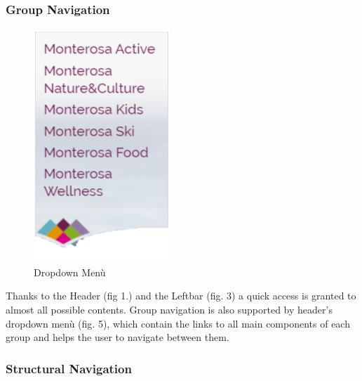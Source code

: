 \subsubsection{Group Navigation}
\begin{figure}
    	\includegraphics[width=0.9\linewidth]{./assets/dropdown-menu.png}
	\caption{Dropdown Menù}
\end{figure} Thanks to the Header (fig 1.) and the Leftbar (fig. 3) a quick access is granted to almost all possible contents. Group navigation is also supported by header's dropdown menù (fig. 5), which contain the links to all main components of each group and helps the user to navigate between them. 

\subsubsection{Structural Navigation}


